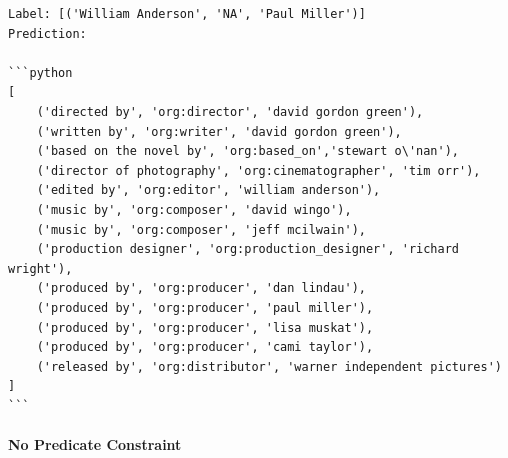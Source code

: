 \documentclass{article}
\begin{document}
\begin{lstlisting}
Label: [('William Anderson', 'NA', 'Paul Miller')]
Prediction: 

```python
[
    ('directed by', 'org:director', 'david gordon green'),
    ('written by', 'org:writer', 'david gordon green'),
    ('based on the novel by', 'org:based_on','stewart o\'nan'),
    ('director of photography', 'org:cinematographer', 'tim orr'),
    ('edited by', 'org:editor', 'william anderson'),
    ('music by', 'org:composer', 'david wingo'),
    ('music by', 'org:composer', 'jeff mcilwain'),
    ('production designer', 'org:production_designer', 'richard wright'),
    ('produced by', 'org:producer', 'dan lindau'),
    ('produced by', 'org:producer', 'paul miller'),
    ('produced by', 'org:producer', 'lisa muskat'),
    ('produced by', 'org:producer', 'cami taylor'),
    ('released by', 'org:distributor', 'warner independent pictures')
]
```
\end{lstlisting}
\paragraph{No Predicate Constraint}
\end{document}
